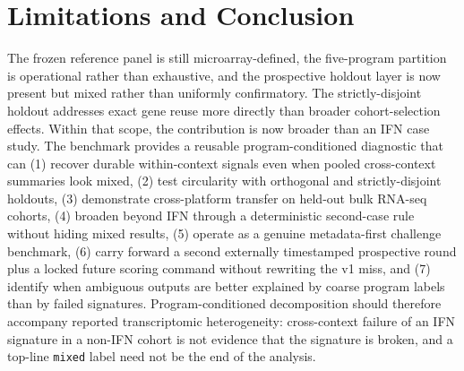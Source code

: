 \documentclass[10pt]{article}
\begin{document}
\section{Limitations and Conclusion}
The frozen reference panel is still microarray-defined, the five-program partition is operational rather than exhaustive, and the prospective holdout layer is now present but mixed rather than uniformly confirmatory. The strictly-disjoint holdout addresses exact gene reuse more directly than broader cohort-selection effects. Within that scope, the contribution is now broader than an IFN case study. The benchmark provides a reusable program-conditioned diagnostic that can (1) recover durable within-context signals even when pooled cross-context summaries look mixed, (2) test circularity with orthogonal and strictly-disjoint holdouts, (3) demonstrate cross-platform transfer on held-out bulk RNA-seq cohorts, (4) broaden beyond IFN through a deterministic second-case rule without hiding mixed results, (5) operate as a genuine metadata-first challenge benchmark, (6) carry forward a second externally timestamped prospective round plus a locked future scoring command without rewriting the v1 miss, and (7) identify when ambiguous outputs are better explained by coarse program labels than by failed signatures. Program-conditioned decomposition should therefore accompany reported transcriptomic heterogeneity: cross-context failure of an IFN signature in a non-IFN cohort is not evidence that the signature is broken, and a top-line \texttt{mixed} label need not be the end of the analysis.
\end{document}
